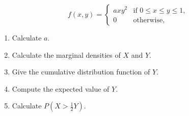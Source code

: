 \documentclass[12pt]{article}
\begin{document}
\[
f(x, y) = 
\begin{cases} 
a x y^2 & \text{if } 0 \leq x \leq y \leq 1, \\
0 & \text{otherwise},
\end{cases}
\]

\begin{enumerate}
    \item Calculate \( a \).
    \item Calculate the marginal densities of \( X \) and \( Y \).
    \item Give the cumulative distribution function of \( Y \).
    \item Compute the expected value of \( Y \).
    \item Calculate \( P\left(X > \frac{1}{2} Y\right) \).
\end{enumerate}
\end{document}
